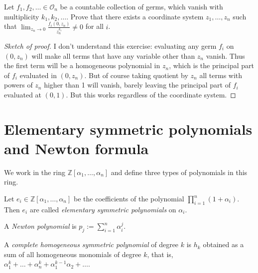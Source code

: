 \begin{exercise}
\label{exercise-principal-parts}
Let $f_1,f_2,\ldots\in \mathcal{O}_n$ be a countable collection of germs, which
vanish with multiplicity $k_1,k_2,\ldots$. Prove that there exists a coordinate
system $z_1,\ldots,z_n$ such that 
$\lim_{z_n\to 0} \frac{f_i(0,z_n)}{z_n^{k_i}}\neq 0$ for all $i$.
\end{exercise}

\begin{proof}[Sketch of proof]
I don't understand this exercise: evaluating any germ $f_i$ on $(0,z_n)$ will
make all terms that have any variable other than $z_n$ vanish. Thus the first
term will be a homogeneous polynomial in $z_n$, which is the principal part of
$f_i$ evaluated in $(0,z_n)$. But of course taking quotient by $z_n$ all terms
with powers of $z_n$ higher than 1 will vanish, barely leaving the principal
part of $f_i$ evaluated at $(0,1)$. But this works regardless of the coordinate
system.
\end{proof}

\section{Elementary symmetric polynomials and Newton formula}
\label{section-elementary-symmetric-polynomials-and-Newton-formula}

We work in the ring $\mathbb{Z}[\alpha_1,\ldots,\alpha_n]$ and define three
types of polynomials in this ring.

\begin{definition}
\label{definition-symmetric-polynomial}
Let $e_i \in \mathbb{Z}[\alpha_1,\ldots,\alpha_n]$ be the coefficients of the
polynomial $\prod_{i=1}^n(1+\alpha_i)$. Then $e_i$ are called {\it elementary
symmetric polynomials} on $\alpha_i$.
\end{definition}

\begin{definition}
\label{definition-Newton-polynomial}
A {\it Newton polynomial} is $p_j:=\sum_{i=1}^n\alpha_i^j$.
\end{definition}

\begin{definition}
\label{definition-complete-homogeneous-symmetric-polynomial}
A {\it complete homogeneous symmetric polynomial} of degree $k$ is $h_k$
obtained as a sum of all homogeneous monomials of degree $k$, that is,
$\alpha_1^k+\ldots+\alpha_n^k+\alpha_1^{k-1}\alpha_2+\ldots$.
\end{definition}

